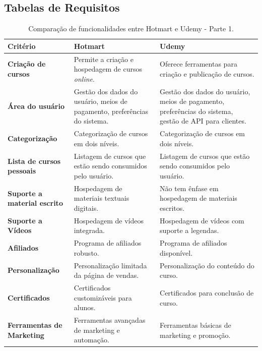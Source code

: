 \begin{apendicesenv}

\partapendices
\chapter{Tabelas de Requisitos}

\begin{table}[h]
    \centering
    \caption{Comparação de funcionalidades entre Hotmart e Udemy - Parte 1.}
    \label{tab:comparacao_hotmart_udemy}
    \begin{adjustbox}{width=\textwidth}
    \begin{tabular}{|p{5cm}|p{5cm}|p{5cm}|}
        \hline
        \textbf{Critério} & \textbf{Hotmart} & \textbf{Udemy} \\
        \hline
        \textbf{Criação de cursos} & Permite a criação e hospedagem de cursos \textit{online}. & Oferece ferramentas para criação e publicação de cursos. \\
        \hline
        \textbf{Área do usuário} & Gestão dos dados do usuário, meios de pagamento, preferências do sistema. & Gestão dos dados do usuário, meios de pagamento, preferências do sistema, gestão de API para clientes. \\
        \hline
        \textbf{Categorização} & Categorização de cursos em dois níveis. & Categorização de cursos em dois níveis. \\
        \hline
        \textbf{Lista de cursos pessoais} & Listagem de cursos que estão sendo consumidos pelo usuário. & Listagem de cursos que estão sendo consumidos pelo usuário. \\
        \hline
        \textbf{Suporte a material escrito} & Hospedagem de materiais textuais digitais. & Não tem ênfase em hospedagem de materiais escritos. \\
        \hline
        \textbf{Suporte a Vídeos} & Hospedagem de vídeos integrada. & Hospedagem de vídeos com suporte a legendas. \\
        \hline
        \textbf{Afiliados} & Programa de afiliados robusto. & Programa de afiliados disponível. \\
        \hline
        \textbf{Personalização} & Personalização limitada da página de vendas. & Personalização do conteúdo do curso. \\
        \hline
        \textbf{Certificados} & Certificados customizáveis para alunos. & Certificados para conclusão de curso. \\
        \hline
        \textbf{Ferramentas de Marketing} & Ferramentas avançadas de marketing e automação. & Ferramentas básicas de marketing e promoção. \\

\end{tabular}
\end{adjustbox}
\end{table}
\end{apendicesenv}
